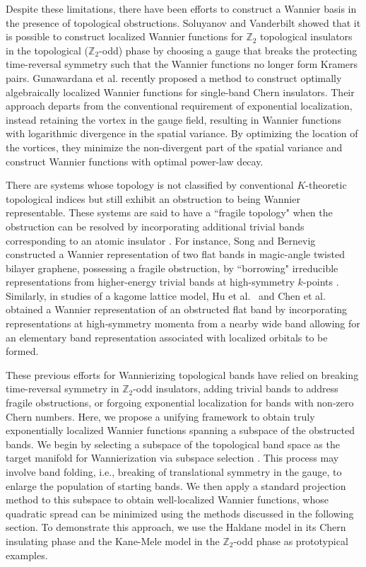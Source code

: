 \documentclass[galley,aps,pra,10pt,amsmath,amssymb,
    superscriptaddress,nofootinbib,longbibliography]{revtex4-2}
\begin{document}
Despite these limitations, there have been efforts to construct a Wannier basis in the presence of topological obstructions. Soluyanov and Vanderbilt \cite{soluyanov2011} showed that it is possible to construct localized Wannier functions for $\mathbb{Z}_2$ topological insulators in the topological ($\mathbb{Z}_2$-odd) phase by choosing a gauge that breaks the protecting time-reversal symmetry such that the Wannier functions no longer form Kramers pairs. Gunawardana et al. \cite{Gunawardana2024} recently proposed a method to construct optimally algebraically localized Wannier functions for single-band Chern insulators. Their approach departs from the conventional requirement of exponential localization, instead retaining the vortex in the gauge field, resulting in Wannier functions with logarithmic divergence in the spatial variance. By optimizing the location of the vortices, they minimize the non-divergent part of the spatial variance and construct Wannier functions with optimal power-law decay.

There are systems whose topology is not classified by conventional $K$-theoretic topological indices but still exhibit an obstruction to being Wannier representable. These systems are said to have a ``fragile topology" when the obstruction can be resolved by incorporating additional trivial bands corresponding to an atomic insulator \cite{bouhon2019, po2019, Po2018}. For instance, Song and Bernevig constructed a Wannier representation of two flat bands in magic-angle twisted bilayer graphene, possessing a fragile obstruction, by ``borrowing" irreducible representations from higher-energy trivial bands at high-symmetry $k$-points \cite{song2022}. Similarly, in studies of a kagome lattice model, Hu et al.~\cite{Hu2023} and Chen et al.~\cite{chen2023} obtained a Wannier representation of an obstructed flat band by incorporating representations at high-symmetry momenta from a nearby wide band allowing for an elementary band representation associated with localized orbitals to be formed. 

These previous efforts for Wannierizing topological bands have relied on breaking time-reversal symmetry in $\mathbb{Z}_2$-odd insulators, adding trivial bands to address fragile obstructions, or forgoing exponential localization for bands with non-zero Chern numbers. Here, we propose a unifying framework to obtain truly exponentially localized Wannier functions spanning a subspace of the obstructed bands. We begin by selecting a subspace of the topological band space as the target manifold for Wannierization via subspace selection \cite{souza2001}. This process may involve band folding, i.e., breaking of translational symmetry in the gauge, to enlarge the population of starting bands. We then apply a standard projection method to this subspace to obtain well-localized Wannier functions, whose quadratic spread can be minimized using the methods discussed in the following section. To demonstrate this approach, we use the Haldane model in its Chern insulating phase and the Kane-Mele model in the $\mathbb{Z}_2$-odd phase as prototypical examples.
\end{document}
